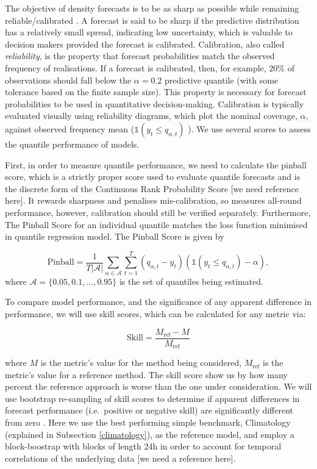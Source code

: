 \documentclass[]{elsarticle} %
\begin{document}
The objective of density forecasts is to be as sharp as possible while remaining reliable/calibrated \citep{Gneiting2007a}. A forecast is said to be sharp if the predictive distribution has a relatively small spread, indicating low uncertainty, which is valuable to decision makers provided the forecast is calibrated. Calibration, also called \emph{reliability}, is the property that forecast probabilities match the observed frequency of realisations. If a forecast is calibrated, then, for example, \(20\%\) of observations should fall below the \(\alpha=0.2\) predictive quantile (with some tolerance based on the finite sample size). This property is necessary for forecast probabilities to be used in quantitative decision-making. Calibration is typically evaluated visually using reliability diagrams, which plot the nominal coverage, \(\alpha\), against observed frequency mean (\(\mathbb{1}(y_{t}\leq q_{\alpha,t})\)
). We use several scores to assess the quantile performance of models.

First, in order to measure quantile performance, we need to calculate the pinball score, which is a strictly proper score used to evaluate quantile forecasts and is the discrete form of the Continuous Rank Probability Score {[}we need reference here{]}. It rewards sharpness and penalises mis-calibration, so measures all-round performance, however, calibration should still be verified separately. Furthermore, The Pinball Score for an individual quantile matches the loss function minimised in quantile regression model. The Pinball Score is given by

\begin{equation}
    \text{Pinball} = 
    \frac{1}{T|\mathcal{A}|} \sum_{\alpha \in \mathcal{A}} \sum_{t=1}^T
 \left(q_{\alpha,t} - y_{t} \right)
 \left(\mathbb{1}(y_{t}\leq q_{\alpha,t})-\alpha \right) ,
 \label{eq:pinball}
\end{equation}
where \(\mathcal{A} = \{0.05,0.1,...,0.95\}\) is the set of quantiles being estimated.

To compare model performance, and the significance of any apparent difference in performance, we will use skill scores, which can be calculated for any metric via:

\begin{equation}
  \mathrm{Skill} = \frac{M_\mathrm{ref} - M}{M_\mathrm{ref}} \label{eq:skillscore}
\end{equation}

where \(M\) is the metric's value for the method being considered, \(M_\mathrm{ref}\) is the metric's value for a reference method. The skill score show us by how many percent the reference approach is worse than the one under consideration.
We will use bootstrap re-sampling of skill scores to determine if apparent differences in forecast performance (i.e.~positive or negative skill) are significantly different from zero \citep{Efron1981Bootstrap}. Here we use the best performing simple benchmark, Climatology (explained in Subsection \ref{climatology}), as the reference model, and employ a block-boostrap with blocks of length 24h in order to account for temporal correlations of the underlying data {[}we need a reference here{]}.
\end{document}
